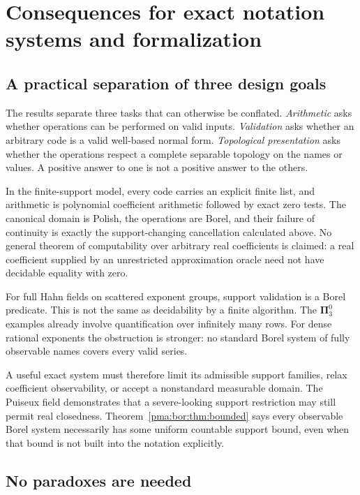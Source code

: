 \documentclass[11pt]{article}
\numberwithin{equation}{section}
\theoremstyle{definition}
\theoremstyle{remark}
\begin{document}
\section{Consequences for exact notation systems and formalization}
\label{pma:bor:sec:consequences}

\subsection{A practical separation of three design goals}

The results separate three tasks that can otherwise be conflated.
\emph{Arithmetic} asks whether operations can be performed on valid inputs.
\emph{Validation} asks whether an arbitrary code is a valid well-based normal
form. \emph{Topological presentation} asks whether the operations respect a
complete separable topology on the names or values. A positive answer to one
is not a positive answer to the others.

In the finite-support model, every code carries an explicit finite list, and
arithmetic is polynomial coefficient arithmetic followed by exact zero tests.
The canonical domain is Polish, the operations are Borel, and their failure
of continuity is exactly the support-changing cancellation calculated above.
No general theorem of computability over arbitrary real coefficients is
claimed: a real coefficient supplied by an unrestricted approximation oracle
need not have decidable equality with zero.

For full Hahn fields on scattered exponent groups, support validation is a
Borel predicate. This is not the same as decidability by a finite algorithm.
The $\boldsymbol\Pi^0_3$ examples already involve quantification over
infinitely many rows. For dense rational exponents the obstruction is stronger:
no standard Borel system of fully observable names covers every valid series.

A useful exact system must therefore limit its admissible support families,
relax coefficient observability, or accept a nonstandard measurable domain.
The Puiseux field demonstrates that a severe-looking support restriction may
still permit real closedness. Theorem~\ref{pma:bor:thm:bounded} says every observable
Borel system necessarily has some uniform countable support bound, even when
that bound is not built into the notation explicitly.

\subsection{No paradoxes are needed}
\end{document}
